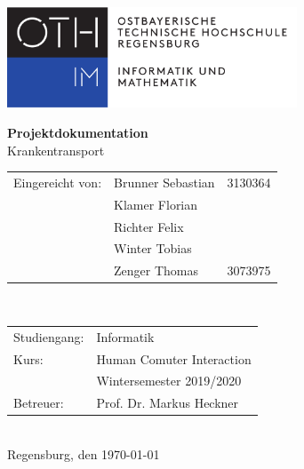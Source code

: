 \documentclass[a4paper, ngerman, 12pt]{scrartcl}
\begin{document}
\begin{titlepage}
\begin{center}
\begin{flushleft}
\includegraphics[height=30mm]{def/OTHR_FakIM_Logo}
\end{flushleft}
\vspace*{3cm}
{\Huge\textbf{Projektdokumentation}}\\
\vspace{1cm}
{\huge Krankentransport}\\
\end{center}
\vspace{\fill}
\begin{normalsize}
\begin{tabular}{p{4cm}p{4cm}p{4cm}}
Eingereicht von:	&Brunner Sebastian		&3130364\\
				&Klamer Florian		&\\
				&Richter Felix			&\\
				&Winter Tobias			&\\
				&Zenger Thomas		&3073975\\
\end{tabular}\\[0.5em]
\begin{tabular}{p{4cm}p{6cm}}
Studiengang:		&Informatik			\\[0.3em]
Kurs:				&Human Comuter Interaction	\\
				&Wintersemester 2019/2020	\\[0.3em]
Betreuer:			&Prof. Dr. Markus Heckner	\\
\end{tabular}\\[3em]
Regensburg, den \today
\end{normalsize}
\vspace{1cm}
\end{titlepage}


\pagestyle{fancy}
\tableofcontents
\newpage

\listoffigures
\newpage

\end{document}
